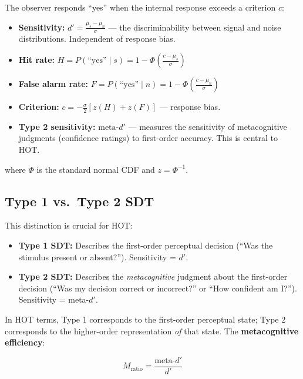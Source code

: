 \documentclass[11pt,a4paper]{report}
\begin{document}
The observer responds ``yes'' when the internal response exceeds a criterion $c$:

\begin{definitionbox}
\begin{itemize}[leftmargin=1.5em]
  \item \textbf{Sensitivity:} $d' = \frac{\mu_s - \mu_n}{\sigma}$ --- the discriminability between signal and noise distributions. Independent of response bias.
  \item \textbf{Hit rate:} $H = P(\text{``yes''} \mid s) = 1 - \Phi\!\left(\frac{c - \mu_s}{\sigma}\right)$
  \item \textbf{False alarm rate:} $F = P(\text{``yes''} \mid n) = 1 - \Phi\!\left(\frac{c - \mu_n}{\sigma}\right)$
  \item \textbf{Criterion:} $c = -\frac{\sigma}{2}[z(H) + z(F)]$ --- response bias.
  \item \textbf{Type 2 sensitivity:} $\text{meta-}d'$ --- measures the sensitivity of metacognitive judgments (confidence ratings) to first-order accuracy. This is central to HOT.
\end{itemize}
where $\Phi$ is the standard normal CDF and $z = \Phi^{-1}$.
\end{definitionbox}

\subsection{Type 1 vs.\ Type 2 SDT}

This distinction is crucial for HOT:

\begin{itemize}[leftmargin=1.5em]
  \item \textbf{Type 1 SDT:} Describes the first-order perceptual decision (``Was the stimulus present or absent?''). Sensitivity = $d'$.
  \item \textbf{Type 2 SDT:} Describes the \emph{metacognitive} judgment about the first-order decision (``Was my decision correct or incorrect?'' or ``How confident am I?''). Sensitivity = meta-$d'$.
\end{itemize}

In HOT terms, Type 1 corresponds to the first-order perceptual state; Type 2 corresponds to the higher-order representation \emph{of} that state. The \textbf{metacognitive efficiency}:

\begin{mathbox}
\vspace{-8pt}
\[
  M_{\text{ratio}} = \frac{\text{meta-}d'}{d'}
\]
\vspace{-10pt}
\end{mathbox}
\end{document}
